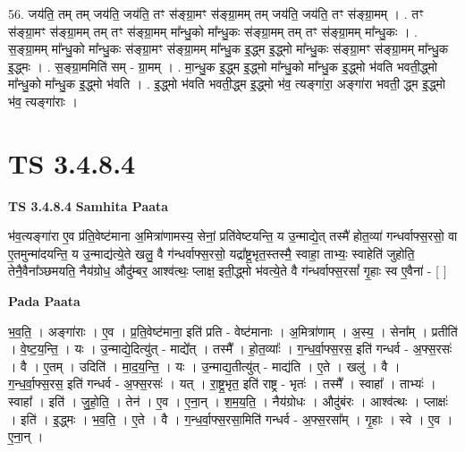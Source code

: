 \documentclass[17pt]{extarticle}
\begin{document}
56. जय॑ति॒ तम् तम् जय॑ति॒ जय॑ति॒ तꣳ स॑ङ्ग्रा॒मꣳ स॑ङ्ग्रा॒मम् तम् जय॑ति॒ जय॑ति॒ तꣳ स॑ङ्ग्रा॒मम् । . तꣳ स॑ङ्ग्रा॒मꣳ स॑ङ्ग्रा॒मम् तम् तꣳ स॑ङ्ग्रा॒मम् मा᳚न्धु॒को मा᳚न्धु॒कः स॑ङ्ग्रा॒मम् तम् तꣳ स॑ङ्ग्रा॒मम् मा᳚न्धु॒कः । . स॒ङ्ग्रा॒मम् मा᳚न्धु॒को मा᳚न्धु॒कः स॑ङ्ग्रा॒मꣳ स॑ङ्ग्रा॒मम् मा᳚न्धु॒क इ॒द्ध्म इ॒द्ध्मो मा᳚न्धु॒कः स॑ङ्ग्रा॒मꣳ स॑ङ्ग्रा॒मम् मा᳚न्धु॒क इ॒द्ध्मः । . स॒ङ्ग्रा॒ममिति॑ सम् - ग्रा॒मम् । . मा॒न्धु॒क इ॒द्ध्म इ॒द्ध्मो मा᳚न्धु॒को मा᳚न्धु॒क इ॒द्ध्मो भ॑वति भवती॒द्ध्मो मा᳚न्धु॒को मा᳚न्धु॒क इ॒द्ध्मो भ॑वति । . इ॒द्ध्मो भ॑वति भवती॒द्ध्म इ॒द्ध्मो भ॑व॒ त्यङ्गा॑रा॒ अङ्गा॑रा भवती॒ द्ध्म इ॒द्ध्मो भ॑व॒ त्यङ्गा॑राः । \newline
\pagebreak
{}

\section{ TS 3.4.8.4 }

\textbf{TS 3.4.8.4 } \newline
\textbf{Samhita Paata} \newline

भ॑व॒त्यङ्गा॑रा ए॒व प्र॑ति॒वेष्ट॑माना अ॒मित्रा॑णामस्य॒ सेनां॒ प्रति॑वेष्टयन्ति॒ य उ॒न्माद्ये॒त् तस्मै॑ होत॒व्या॑ गन्धर्वाफ्स॒रसो॒ वा ए॒तमुन्मा॑दयन्ति॒ य उ॒न्माद्य॑त्ये॒ते खलु॒ वै ग॑न्धर्वाफ्स॒रसो॒ यद्रा᳚ष्ट्र॒भृत॒स्तस्मै॒ स्वाहा॒ ताभ्यः॒ स्वाहेति॑ जुहोति॒ तेनै॒वैना᳚ञ्छमयति॒ नैय॑ग्रोध॒ औदु॑म्बर॒ आश्व॑त्थः॒ प्लाक्ष॒ इती॒द्ध्मो भ॑वत्ये॒ते वै ग॑न्धर्वाफ्स॒रसां᳚ गृ॒हाः स्व ए॒वैना॑ - [  ] \newline

\textbf{Pada Paata} \newline

भ॒व॒ति॒ । अङ्गा॑राः । ए॒व । प्र॒ति॒वेष्ट॑माना॒ इति॑ प्रति - वेष्ट॑मानाः । अ॒मित्रा॑णाम् । अ॒स्य॒ । सेना᳚म् । प्रतीति॑ । वे॒ष्ट॒य॒न्ति॒ । यः । उ॒न्माद्ये॒दित्यु॑त् - माद्ये᳚त् । तस्मै᳚ । हो॒त॒व्याः᳚ । ग॒न्ध॒र्वा॒फ्स॒रस॒ इति॑ गन्धर्व - अ॒फ्स॒रसः॑ । वै । ए॒तम् । उदिति॑ । मा॒द॒य॒न्ति॒ । यः । उ॒न्माद्य॒तीत्यु॑त् - माद्य॑ति । ए॒ते । खलु॑ । वै । ग॒न्ध॒र्वा॒फ्स॒रस॒ इति॑ गन्धर्व - अ॒फ्स॒रसः॑ । यत् । रा॒ष्ट्र॒भृत॒ इति॑ राष्ट्र - भृतः॑ । तस्मै᳚ । स्वाहा᳚ । ताभ्यः॑ । स्वाहा᳚ । इति॑ । जु॒हो॒ति॒ । तेन॑ । ए॒व । ए॒ना॒न् । श॒म॒य॒ति॒ । नैय॑ग्रोधः । औदु॑बंरः । आश्व॑त्थः । प्लाक्षः॑ । इति॑ । इ॒द्ध्मः । भ॒व॒ति॒ । ए॒ते । वै । ग॒न्ध॒र्वा॒फ्स॒रसा॒मिति॑ गन्धर्व - अ॒फ्स॒रसा᳚म् । गृ॒हाः । स्वे । ए॒व । ए॒ना॒न् ।  \newline
\end{document}
